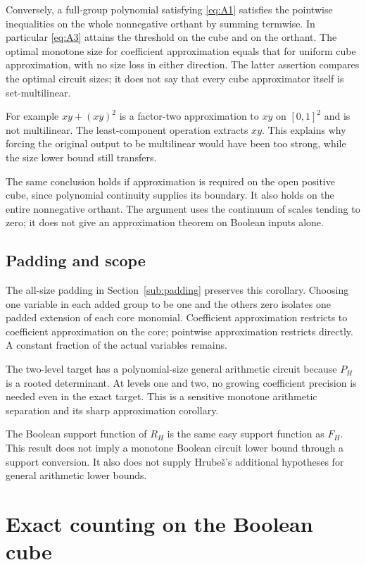 \documentclass[11pt]{article}
\theoremstyle{definition}
\theoremstyle{remark}
\numberwithin{equation}{section}
\begin{document}
Conversely, a full-group polynomial satisfying \eqref{eq:A1} satisfies
the pointwise inequalities on the whole nonnegative orthant
by summing termwise. In particular \eqref{eq:A3} attains the threshold
on the cube and on the orthant. The optimal monotone size
for coefficient approximation equals that for uniform cube
approximation, with no size loss in either direction.
The latter assertion compares the optimal circuit sizes;
it does not say that every cube approximator itself is
set-multilinear.

For example \(xy+(xy)^2\) is a factor-two approximation to
\(xy\) on \([0,1]^2\) and is not multilinear. The least-component
operation extracts \(xy\). This explains why forcing the
original output to be multilinear would have been too strong,
while the size lower bound still transfers.

The same conclusion holds if approximation is required on the
open positive cube, since polynomial continuity supplies its
boundary. It also holds on the entire nonnegative orthant.
The argument uses the continuum of scales tending to zero;
it does not give an approximation theorem on Boolean inputs alone.

\subsection{Padding and scope}

The all-size padding in Section~\ref{sub:padding} preserves this
corollary. Choosing one variable in each added group to be one
and the others zero isolates one padded extension of each core
monomial. Coefficient approximation restricts to coefficient
approximation on the core; pointwise approximation restricts
directly. A constant fraction of the actual variables remains.

The two-level target has a polynomial-size general arithmetic
circuit because \(P_H\) is a rooted determinant. At levels one
and two, no growing coefficient precision is needed even in
the exact target. This is a sensitive monotone arithmetic
separation and its sharp approximation corollary.

The Boolean support function of \(R_H\) is the same easy support
function as \(F_H\). This result does not imply a monotone Boolean
circuit lower bound through a support conversion. It also does
not supply Hrube\v{s}'s additional hypotheses for general arithmetic
lower bounds. 


\section{Exact counting on the Boolean cube}\label{sec:counting}
\end{document}
